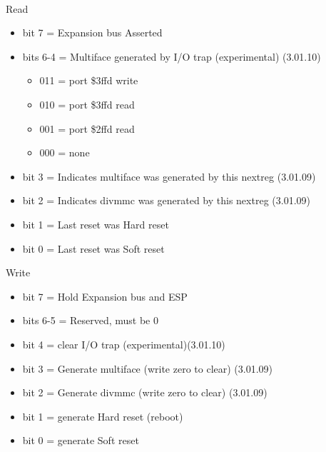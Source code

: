 \\
Read
\begin{itemize}
\item bit 7 = Expansion bus  Asserted
\item bits 6-4 = Multiface  generated by I/O trap
(experimental) (3.01.10)
\begin{itemize}
\item[] 011 = port \$3ffd write
\item[] 010 = port \$3ffd read
\item[] 001 = port \$2ffd read
\item[] 000 = none
\end{itemize}
\item bit 3 = Indicates multiface  was generated by this
nextreg (3.01.09)
\item bit 2 = Indicates divmmc  was generated by this
nextreg (3.01.09)
\item bit 1 = Last reset was Hard reset
\item bit 0 = Last reset was Soft reset
\end{itemize}
Write
\begin{itemize}
\item bit 7 = Hold Expansion bus and ESP 
\item bits 6-5 = Reserved, must be 0
\item bit 4 = clear I/O trap (experimental)(3.01.10)
\item bit 3 = Generate multiface  (write zero to clear)
(3.01.09)
\item bit 2 = Generate divmmc  (write zero to clear)
(3.01.09)
\item bit 1 = generate Hard reset (reboot)
\item bit 0 = generate Soft reset
\end{itemize}

